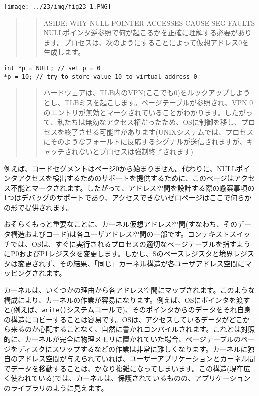 \texttt{[image: ../23/img/fig23\_1.PNG]}

\begin{quote}
\begin{quote}
ASIDE: WHY NULL POINTER ACCESSES CAUSE SEG FAULTS\\
NULLポインタ逆参照で何が起こるかを正確に理解する必要があります。プロセスは、次のようにすることによって仮想アドレス0を生成します。
\end{quote}
\end{quote}

\begin{verbatim}
int *p = NULL; // set p = 0
*p = 10; // try to store value 10 to virtual address 0
\end{verbatim}

\begin{quote}
\begin{quote}
ハードウェアは、TLB内のVPN(ここでも0)をルックアップしようとし、TLBミスを起こします。ページテーブルが参照され、VPN
0のエントリが無効とマークされていることがわかります。したがって、私たちは無効なアクセス権だったため、OSに制御を移し、プロセスを終了させる可能性があります(UNIXシステムでは、プロセスにそのようなフォールトに反応するシグナルが送信されますが、キャッチされないとプロセスは強制終了されます)
\end{quote}
\end{quote}

例えば、コードセグメントはページ0から始まりません。代わりに、NULLポインタアクセスを検出するためのサポートを提供するために、このページはアクセス不能とマークされます。したがって、アドレス空間を設計する際の懸案事項の1つはデバッグのサポートであり、アクセスできないゼロページはここで何らかの形で提供されます。

おそらくもっと重要なことに、カーネル仮想アドレス空間(すなわち、そのデータ構造およびコード)は各ユーザアドレス空間の一部です。コンテキストスイッチでは、OSは、すぐに実行されるプロセスの適切なページテーブルを指すようにP0およびP1レジスタを変更します。しかし、Sのベースレジスタと境界レジスタは変更されず、その結果、「同じ」カーネル構造が各ユーザアドレス空間にマッピングされます。

カーネルは、いくつかの理由から各アドレス空間にマップされます。このような構成により、カーネルの作業が容易になります。例えば、OSにポインタを渡すと(例えば、\texttt{write()}システムコールで)、そのポインタからのデータをそれ自身の構造にコピーすることは容易です。OSは、アクセスしているデータがどこから来るのか心配することなく、自然に書かれコンパイルされます。これとは対照的に、カーネルが完全に物理メモリに置かれていた場合、ページテーブルのページをディスクにスワップするなどの作業は非常に難しくなります。カーネルに独自のアドレス空間が与えられていれば、ユーザーアプリケーションとカーネル間でデータを移動することは、かなり複雑になってしまいます。この構造(現在広く使われている)では、カーネルは、保護されているものの、アプリケーションのライブラリのように見えます。

